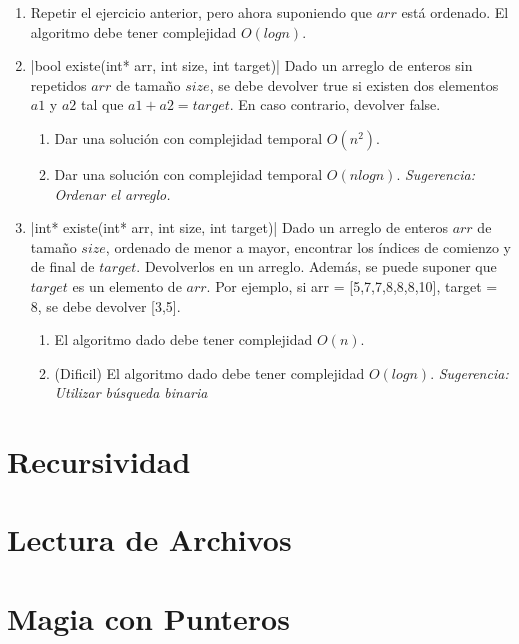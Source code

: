 \documentclass[titlepage,oneside]{book}
\begin{document}
\begin{enumerate}
    \item Repetir el ejercicio anterior, pero ahora suponiendo que $arr$ está ordenado. El algoritmo debe tener complejidad $O(log{}n)$.

    \item{}|bool existe(int* arr, int size, int target)|
    Dado un arreglo de enteros sin repetidos $arr$ de tamaño $size$, se debe devolver true si existen dos elementos $a1$ y $a2$ tal que $a1 + a2 = target$. En caso contrario, devolver false.
    \begin{enumerate}
        \item Dar una solución con complejidad temporal $O(n^2)$.
        \item Dar una solución con complejidad temporal $O(n logn)$. \newline\textit{Sugerencia: Ordenar el arreglo.}
    \end{enumerate}

    \item{}|int* existe(int* arr, int size, int target)|
    Dado un arreglo de enteros $arr$ de tamaño $size$, ordenado de menor a mayor, encontrar los índices de comienzo y de final de $target$. Devolverlos en un arreglo. Además, se puede suponer que $target$ es un elemento de $arr$.
    \newline
    Por ejemplo, si arr = [5,7,7,8,8,8,10], target = 8, se debe devolver [3,5].
    \begin{enumerate}
        \item El algoritmo dado debe tener complejidad $O(n)$.
        \item (Dificil) El algoritmo dado debe tener complejidad $O(log{}n)$.\newline
        \textit{Sugerencia: Utilizar búsqueda binaria}
    \end{enumerate}
    
    
\end{enumerate}


\chapter{Recursividad}

\chapter{Lectura de Archivos}

\chapter{Magia con Punteros}
\end{document}
